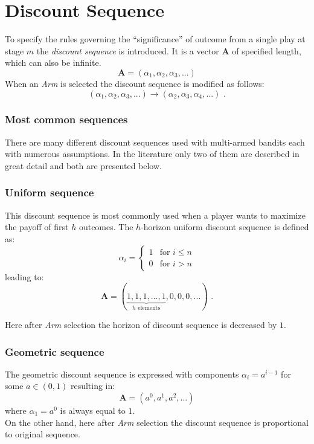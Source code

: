 \documentclass[12pt, a4paper, pdflatex, leqno]{report}
\begin{document}
\section{Discount Sequence}
To specify the rules governing the ``significance'' of outcome from a single play at stage $m$ the \emph{discount sequence} is introduced. It is a vector $\mathbf{A}$ of specified length, which can also be infinite.
$$
\mathbf{A} = \left( \alpha_1, \alpha_2, \alpha_3, ... \right)
$$
When an \emph{Arm} is selected the discount sequence is modified as follows:
$$
\left( \alpha_1, \alpha_2, \alpha_3, ... \right)
\rightarrow
\left( \alpha_2, \alpha_3, \alpha_4, ... \right) \text{ .}
$$

\subsubsection{Most common sequences}
There are many different discount sequences used with multi-armed bandits each with numerous assumptions. In the literature only two of them are described in great detail and both are presented below.

\subsubsection{Uniform sequence}
This discount sequence is most commonly used when a player wants to maximize the payoff of first $h$ outcomes.
The $h$-horizon uniform discount sequence is defined as:
$$
 \alpha_i =
  \begin{cases}
   1 & \text{for } i \leq n \\
   0 & \text{for } i > n
  \end{cases}
$$
leading to:
$$
  \mathbf{A} = ( \underbrace{ 1, 1, 1, ..., 1}_{h\text{ elements}}, 0, 0, 0, ... ) \text{ .}
$$

Here after \emph{Arm} selection the horizon of discount sequence is decreased by $1$.


\subsubsection{Geometric sequence}
The geometric discount sequence is expressed with components $\alpha_i = a^{i-1}$ for some $a \in ( 0, 1 )$ resulting in:
$$
\mathbf{A} = \left( a^0, a^1, a^2, ... \right)
$$
where $\alpha_1 = a^0$ is always equal to $1$.\\

On the other hand, here after \emph{Arm} selection the discount sequence is proportional to original sequence.\\
\end{document}

